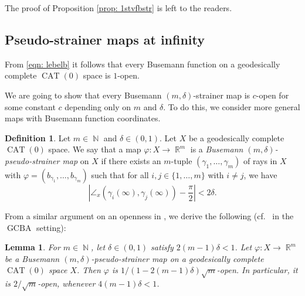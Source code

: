 \documentclass[a4paper,12pt]{amsart}
\newcommand{\CAT}{\operatorname{CAT}}
\newcommand{\GCBA}{\operatorname{GCBA}}
\newcommand{\R}{\operatorname{\mathbb{R}}}
\newcommand{\N}{\operatorname{\mathbb{N}}}
\numberwithin{equation}{section}
\theoremstyle{plain}
\newtheorem{lem}[thm]{Lemma}
\theoremstyle{definition}
\newtheorem{defn}{Definition}[section]
\theoremstyle{remark}
\begin{document}
The proof of Proposition \ref{prop: 1stvfbstr}
is left to the readers.

\subsection{Pseudo-strainer maps at infinity}

From \eqref{eqn: lebelb} it follows that
every Busemann function on a geodesically complete $\CAT(0)$ space
is $1$-open.

We are going to show that 
every Busemann $(m,\delta)$-strainer map is $c$-open
for some constant $c$ depending only on $m$ and $\delta$.
To do this,
we consider more general maps with Busemann function coordinates.

\begin{defn}\label{defn: bsstrm}
Let $m \in \N$ and $\delta \in (0,1)$.
Let $X$ be a geodesically complete $\CAT(0)$ space.
We say that a map $\varphi \colon X \to \R^m$ is a
\emph{Busemann $(m,\delta)$-pseudo-strainer map} on $X$
if there exists an $m$-tuple 
$\left( \gamma_1, \dots, \gamma_m \right)$
of rays in $X$ 
with $\varphi = \left( b_{\gamma_1}, \dots, b_{\gamma_m} \right)$
such that
for all $i, j \in \{ 1, \dots, m \}$ with $i \neq j$,
we have
\begin{equation}
\left\vert \angle_x \left( \gamma_i(\infty), \gamma_j(\infty) \right) -
\frac{\pi}{2} \right\vert
< 2\delta.
\label{eqn: bsstrma}
\end{equation}
\end{defn}

From a similar argument on an openness in 
\cite[Lemma 6.3]{nagano6},
we derive the following
(cf.~\cite[Lemma 8.1]{lytchak-nagano1} in the $\GCBA$ setting):

\begin{lem}\label{lem: wwopen}
For $m \in \N$, 
let $\delta \in (0,1)$ satisfy $2(m-1)\delta < 1$.
Let $\varphi \colon X \to \R^m$
be a Busemann $(m,\delta)$-pseudo-strainer map on 
a geodesically complete $\CAT(0)$ space $X$.
Then $\varphi$
is $1/(1-2(m-1)\delta)\sqrt{m}$-open.
In particular,
it is $2/\sqrt{m}$-open,
whenever $4(m-1)\delta < 1$.
\end{lem}
\end{document}
